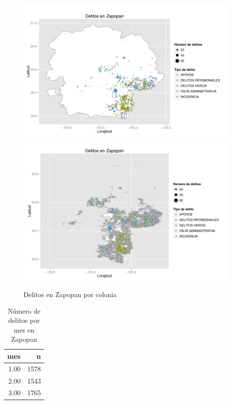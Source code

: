 \begin{figure}[H]
\centering
\caption{Delitos en Zapopan por colonia}
\includegraphics[width=120mm]{../../graphs/num_delitos.pdf}
\includegraphics[width=120mm]{../../graphs/num_delitos_manz.pdf}
\end{figure}


\begin{table}[H]
\centering
\caption{Número de delitos por mes en Zapopan} 
\begin{tabular}{rr}
  \hline
mes & n \\ 
  \hline
1.00 & 1578 \\ 
  2.00 & 1543 \\ 
  3.00 & 1765 \\ 
   \hline
\end{tabular}

\end{table}


